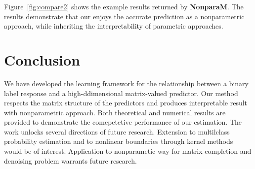 \documentclass[11pt]{article}
\theoremstyle{definition}
\def\NonparaM{\text{\bf \small NonparaM }}
\begin{document}
 Figure~\ref{fig:compare2} shows the example results returned by {\bf \small NonparaM}.  The results demonstrate that our \NonparaM enjoys the accurate prediction as a nonparametric approach, while inheriting the interpretability of parametric approaches. 


\vspace{-.5cm}
\section{Conclusion}
\vspace{-.3cm}
We have developed the learning framework for the relationship between a binary label response and a high-ddimensional matrix-valued predictor. Our method respects the matrix structure of the predictors and produces interpretable result with nonparametric approach. Both theoretical and numerical results are provided to demonstrate the comepetetive performance of our estimation. The work unlocks several directions of future research. Extension to multilclass probability estimation and to nonlinear boundaries through kernel methods would be of interest. Application to nonparametic way for matrix completion and denoising problem warrants future research.

\singlespacing


\end{document}
